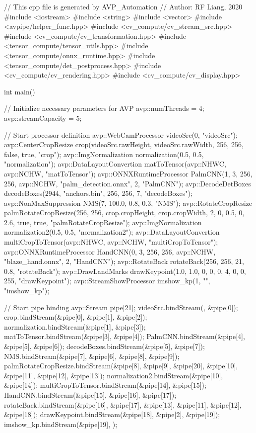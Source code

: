 \newpage
\begin{codeblock}[language=C++, basicstyle=\ttfamily\footnotesize, numbers=left, caption=Hand Example]\label{code:hand}
// This cpp file is generated by AVP\_Automation
// Author: RF Liang, 2020
#include <iostream>
#include <string>
#include <vector>
#include <avpipe/helper_func.hpp>
#include <cv_compute/cv_stream_src.hpp>
#include <cv_compute/cv_transformation.hpp>
#include <tensor_compute/tensor_utils.hpp>
#include <tensor_compute/onnx_runtime.hpp>
#include <tensor_compute/det_postprocess.hpp>
#include <cv_compute/cv_rendering.hpp>
#include <cv_compute/cv_display.hpp>

int main()
{
    // Initialize necessary parameters for AVP
    avp::numThreads = 4;
    avp::streamCapacity = 5;

    // Start processor definition
    avp::WebCamProcessor videoSrc(0, "videoSrc");
    avp::CenterCropResize crop(videoSrc.rawHeight, videoSrc.rawWidth, 256, 256, false, true, "crop");
    avp::ImgNormalization normalization(0.5, 0.5, "normalization");
    avp::DataLayoutConvertion matToTensor(avp::NHWC, avp::NCHW, "matToTensor");
    avp::ONNXRuntimeProcessor PalmCNN({1, 3, 256, 256}, avp::NCHW, "palm_detection.onnx", 2, "PalmCNN");
    avp::DecodeDetBoxes decodeBoxes(2944, "anchors.bin", 256, 256, 7, "decodeBoxes");
    avp::NonMaxSuppression NMS(7, 100.0, 0.8, 0.3, "NMS");
    avp::RotateCropResize palmRotateCropResize(256, 256, crop.cropHeight, crop.cropWidth, 2, 0, 0.5, 0, 2.6, true, true, "palmRotateCropResize");
    avp::ImgNormalization normalization2(0.5, 0.5, "normalization2");
    avp::DataLayoutConvertion multiCropToTensor(avp::NHWC, avp::NCHW, "multiCropToTensor");
    avp::ONNXRuntimeProcessor HandCNN({0, 3, 256, 256}, avp::NCHW, "blaze_hand.onnx", 2, "HandCNN");
    avp::RotateBack rotateBack(256, 256, 21, 0.8, "rotateBack");
    avp::DrawLandMarks drawKeypoint(1.0, 1.0, 0, 0, 0, 4, {0, 0, 255}, "drawKeypoint");
    avp::StreamShowProcessor imshow_kp(1, "", "imshow_kp");

    // Start pipe binding
    avp::Stream pipe[21];
    videoSrc.bindStream({}, {&pipe[0]});
    crop.bindStream({&pipe[0]}, {&pipe[1], &pipe[2]});
    normalization.bindStream({&pipe[1]}, {&pipe[3]});
    matToTensor.bindStream({&pipe[3]}, {&pipe[4]});
    PalmCNN.bindStream({&pipe[4]}, {&pipe[5], &pipe[6]});
    decodeBoxes.bindStream({&pipe[5]}, {&pipe[7]});
    NMS.bindStream({&pipe[7], &pipe[6]}, {&pipe[8], &pipe[9]});
    palmRotateCropResize.bindStream({&pipe[8], &pipe[9], &pipe[20]}, {&pipe[10], &pipe[11], &pipe[12], &pipe[13]});
    normalization2.bindStream({&pipe[10]}, {&pipe[14]});
    multiCropToTensor.bindStream({&pipe[14]}, {&pipe[15]});
    HandCNN.bindStream({&pipe[15]}, {&pipe[16], &pipe[17]});
    rotateBack.bindStream({&pipe[16], &pipe[17], &pipe[13], &pipe[11], &pipe[12]}, {&pipe[18]});
    drawKeypoint.bindStream({&pipe[18], &pipe[2]}, {&pipe[19]});
    imshow_kp.bindStream({&pipe[19]}, {});

}
\end{codeblock}
